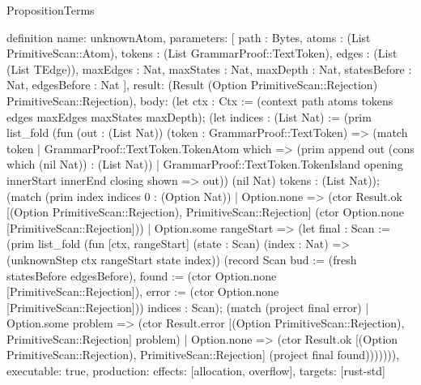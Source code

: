 \begin{lexlean}{PropositionTerms}
\begin{semanticmodule}
definition{
  name: unknownAtom,
  parameters: [
    path : Bytes,
    atoms : (List PrimitiveScan::Atom),
    tokens : (List GrammarProof::TextToken),
    edges : (List (List TEdge)),
    maxEdges : Nat,
    maxStates : Nat,
    maxDepth : Nat,
    statesBefore : Nat,
    edgesBefore : Nat
  ],
  result: (Result (Option PrimitiveScan::Rejection) PrimitiveScan::Rejection),
  body: (let ctx : Ctx := (context path atoms tokens edges maxEdges maxStates maxDepth); (let indices : (List Nat) := (prim list_fold (fun (out : (List Nat)) (token : GrammarProof::TextToken) => (match token
    | GrammarProof::TextToken.TokenAtom which => (prim append out (cons which (nil Nat)) : (List Nat))
    | GrammarProof::TextToken.TokenIsland opening innerStart innerEnd closing shown => out)) (nil Nat) tokens : (List Nat)); (match (prim index indices 0 : (Option Nat))
    | Option.none => (ctor Result.ok [(Option PrimitiveScan::Rejection), PrimitiveScan::Rejection] (ctor Option.none [PrimitiveScan::Rejection]))
    | Option.some rangeStart => (let final : Scan := (prim list_fold (fun [ctx, rangeStart] (state : Scan) (index : Nat) => (unknownStep ctx rangeStart state index)) (record Scan {bud := (fresh statesBefore edgesBefore), found := (ctor Option.none [PrimitiveScan::Rejection]), error := (ctor Option.none [PrimitiveScan::Rejection])}) indices : Scan); (match (project final error)
      | Option.some problem => (ctor Result.error [(Option PrimitiveScan::Rejection), PrimitiveScan::Rejection] problem)
      | Option.none => (ctor Result.ok [(Option PrimitiveScan::Rejection), PrimitiveScan::Rejection] (project final found))))))),
  executable: true,
  production: {effects: [allocation, overflow], targets: [rust-std]}
}


\end{semanticmodule}
\end{lexlean}
